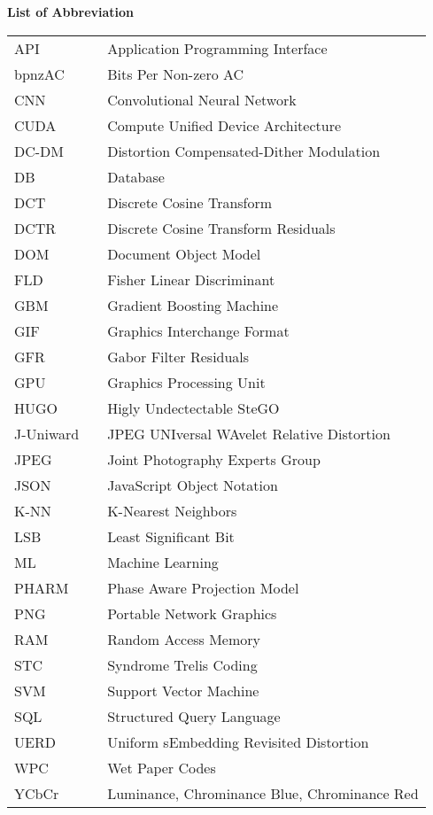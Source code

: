 
\begin{flushleft}
    \Huge{\textbf{List of Abbreviation}}\vspace{1cm}\\
\end{flushleft}
\normalsize{\begin{tabular}{l l l}
    API         && Application Programming Interface\\
    bpnzAC      && Bits Per Non-zero AC\\
    CNN         && Convolutional Neural Network\\
    CUDA        && Compute Unified Device Architecture\\
    DC-DM       && Distortion Compensated-Dither Modulation\\
    DB          && Database\\
    DCT         && Discrete Cosine Transform\\
    DCTR        && Discrete Cosine Transform Residuals\\
    DOM         && Document Object Model\\
    FLD         && Fisher Linear Discriminant\\
    GBM         && Gradient Boosting Machine\\
    GIF         && Graphics Interchange Format\\
    GFR         && Gabor Filter Residuals\\
    GPU         && Graphics Processing Unit\\
    HUGO        && Higly Undectectable SteGO\\
    J-Uniward   && JPEG UNIversal WAvelet Relative Distortion\\
    JPEG       & & Joint Photography Experts Group\\
    JSON        && JavaScript Object Notation\\
    K-NN        && K-Nearest Neighbors\\
    LSB         && Least Significant Bit\\
    ML          && Machine Learning\\
    PHARM       && Phase Aware Projection Model\\
    PNG         && Portable Network Graphics\\
    RAM         && Random Access Memory\\
    STC        && Syndrome Trelis Coding\\
    SVM       && Support Vector Machine\\
    SQL        & & Structured Query Language\\
    UERD       & & Uniform sEmbedding Revisited Distortion\\ 
    WPC        && Wet Paper Codes\\
    YCbCr      &&Luminance, Chrominance Blue, Chrominance Red\\

\end{tabular} }


